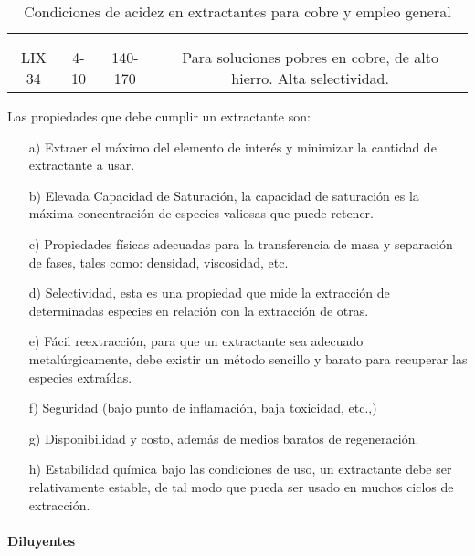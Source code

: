 \begin{table}[H]
\begin{center}
\begin{tabular}{|c|c|c|c|}
 & & & \\
 & & & \\
\hline
\multirow{2}{1.7cm}{LIX 34}&\multirow{2}{*}{4-10}&\multirow{2}{*}{140-170}&\multirow{2}{5.5cm}{Para soluciones pobres en cobre, de alto hierro. Alta selectividad.}\\
 & & & \\
\hline
\end{tabular}
\end{center}
\caption{Condiciones de acidez en extractantes para cobre y empleo general}
\end{table}

Las propiedades que debe cumplir un extractante son:
\begin{itemize}
 \item[a)] Extraer el m\'aximo del elemento de inter\'es y minimizar la cantidad de extractante a usar.
 \item[b)] Elevada Capacidad de Saturaci\'on, la capacidad de saturaci\'on es la m\'axima concentraci\'on de especies valiosas que puede retener.
 \item[c)] Propiedades f\'isicas adecuadas para la transferencia de masa y separaci\'on de fases, tales como: densidad, viscosidad, etc.
 \item[d)] Selectividad, esta es una propiedad que mide la extracci\'on de determinadas especies en relaci\'on con la extracci\'on de otras.
 \item[e)] F\'acil reextracci\'on, para que un extractante sea adecuado metal\'urgicamente, debe existir un m\'etodo sencillo y barato para recuperar las especies extra\'idas.  
 \item[f)] Seguridad (bajo punto de inflamaci\'on, baja toxicidad, etc.,)
 \item[g)] Disponibilidad y costo, adem\'as de medios baratos de regeneraci\'on.
 \item[h)] Estabilidad qu\'imica bajo las condiciones de uso, un extractante debe ser relativamente estable, de tal modo que pueda ser usado  en muchos ciclos de extracci\'on.
\end{itemize}

\paragraph{Diluyentes}

